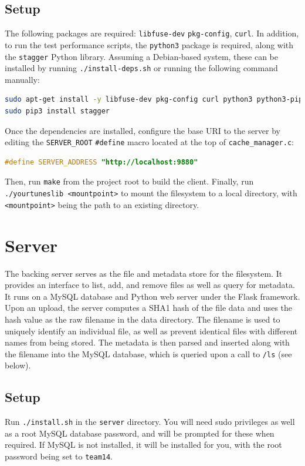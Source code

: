 \documentclass{article}
\begin{document}
	\pagebreak
	
	\subsection{Setup}
	The following packages are required: \texttt{libfuse-dev} \texttt{pkg-config}, \texttt{curl}. In addition, to run the test performance scripts, the \texttt{python3} package is required, along with the \texttt{stagger} Python library. Assuming a Debian-based system, these can be installed by running \texttt{./install-deps.sh} or running the following command manually:
	
\begin{lstlisting}[language=Bash]
sudo apt-get install -y libfuse-dev pkg-config curl python3 python3-pip
sudo pip3 install stagger
\end{lstlisting}
	
	\noindent Once the dependencies are installed, configure the base URI to the server by editing the \texttt{SERVER\_ROOT} \texttt{\#define} macro located at the top of \texttt{cache\_manager.c}:
\begin{lstlisting}[language=C,firstnumber=9]
#define SERVER_ADDRESS "http://localhost:9880"
\end{lstlisting}
	Then, run \texttt{make} from the project root to build the client. Finally, run \texttt{./yourtuneslib <mountpoint>} to mount the filesystem to a local directory, with \texttt{<mountpoint>} being the path to an existing directory.
	
	\section{Server}
	The backing server serves as the file and metadata store for the filesystem. It provides an interface to list, add, and remove files as well as query for metadata. It runs on a MySQL database and Python web server under the Flask framework. \\
	
	\noindent Upon an upload, the server computes a SHA1 hash of the file data and uses the hash value as the raw filename in the data directory. The filename is used to uniquely identify an individual file, as well as prevent identical files with different names from being stored. The metadata is then parsed and inserted along with the filename into the MySQL database, which is queried upon a call to \texttt{/ls} (see below).
	
	\subsection{Setup}
	Run \texttt{./install.sh} in the \texttt{server} directory. You will need sudo privileges as well as a root MySQL database password, and will be prompted for these when required. If MySQL is not installed, it will be installed for you, with the root password being set to \texttt{team14}. \\
	
\end{document}
